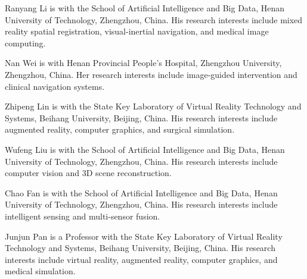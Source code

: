 \documentclass[journal]{IEEEtran}
\begin{document}



\begin{IEEEbiographynophoto}{Ranyang Li}
is with the School of Artificial Intelligence and Big Data, Henan University of Technology, Zhengzhou, China. His research interests include mixed reality spatial registration, visual-inertial navigation, and medical image computing.
\end{IEEEbiographynophoto}

\begin{IEEEbiographynophoto}{Nan Wei}
is with Henan Provincial People's Hospital, Zhengzhou University, Zhengzhou, China. Her research interests include image-guided intervention and clinical navigation systems.
\end{IEEEbiographynophoto}

\begin{IEEEbiographynophoto}{Zhipeng Lin}
is with the State Key Laboratory of Virtual Reality Technology and Systems, Beihang University, Beijing, China. His research interests include augmented reality, computer graphics, and surgical simulation.
\end{IEEEbiographynophoto}

\begin{IEEEbiographynophoto}{Wufeng Liu}
is with the School of Artificial Intelligence and Big Data, Henan University of Technology, Zhengzhou, China. His research interests include computer vision and 3D scene reconstruction.
\end{IEEEbiographynophoto}

\begin{IEEEbiographynophoto}{Chao Fan}
is with the School of Artificial Intelligence and Big Data, Henan University of Technology, Zhengzhou, China. His research interests include intelligent sensing and multi-sensor fusion.
\end{IEEEbiographynophoto}

\begin{IEEEbiographynophoto}{Junjun Pan}
is a Professor with the State Key Laboratory of Virtual Reality Technology and Systems, Beihang University, Beijing, China. His research interests include virtual reality, augmented reality, computer graphics, and medical simulation.
\end{IEEEbiographynophoto}
\end{document}

